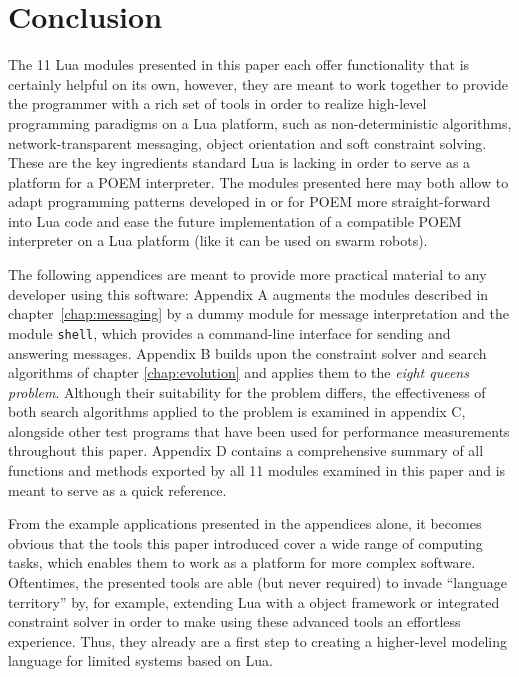\chapter*{Conclusion}

The 11 Lua modules presented in this paper each offer functionality that is certainly helpful on its own, however, they are meant to work together to provide the programmer with a rich set of tools in order to realize high-level programming paradigms on a Lua platform, such as non-deterministic algorithms, network-transparent messaging, object orientation and soft constraint solving. These are the key ingredients standard Lua is lacking in order to serve as a platform for a POEM interpreter. The modules presented here may both allow to adapt programming patterns developed in or for POEM more straight-forward into Lua code and ease the future implementation of a compatible POEM interpreter on a Lua platform (like it can be used on swarm robots).

The following appendices are meant to provide more practical material to any developer using this software: Appendix A augments the modules described in chapter~\ref{chap:messaging} by a dummy module for message interpretation and the module \texttt{shell}, which provides a command-line interface for sending and answering messages. Appendix B builds upon the constraint solver and search algorithms of chapter \ref{chap:evolution} and applies them to the \emph{eight queens problem}. Although their suitability for the problem differs, the effectiveness of both search algorithms applied to the problem is examined in appendix C, alongside other test programs that have been used for performance measurements throughout this paper. Appendix D contains a comprehensive summary of all functions and methods exported by all 11 modules examined in this paper and is meant to serve as a quick reference.

From the example applications presented in the appendices alone, it becomes obvious that the tools this paper introduced cover a wide range of computing tasks, which enables them to work as a platform for more complex software. Oftentimes, the presented tools are able (but never required) to invade ``language territory'' by, for example, extending Lua with a object framework or integrated constraint solver in order to make using these advanced tools an effortless experience. Thus, they already are a first step to creating a higher-level modeling language for limited systems based on Lua.

\newpage
\thispagestyle{plain}
